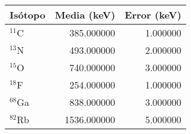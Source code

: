 \begin{tabular}{lrr}
\toprule
Isótopo & Media (keV) & Error (keV) \\
\midrule
$^{11}$C & 385.000000 & 1.000000 \\
$^{13}$N & 493.000000 & 2.000000 \\
$^{15}$O & 740.000000 & 3.000000 \\
$^{18}$F & 254.000000 & 1.000000 \\
$^{68}$Ga & 838.000000 & 3.000000 \\
$^{82}$Rb & 1536.000000 & 5.000000 \\
\bottomrule
\end{tabular}
